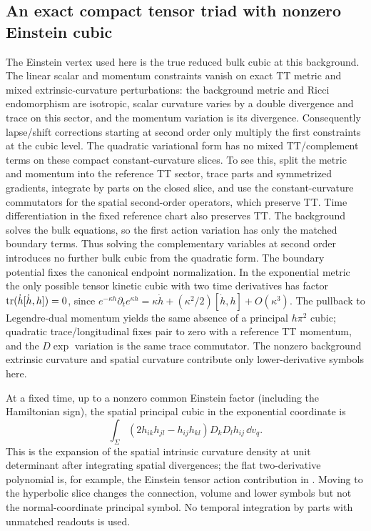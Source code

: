\subsection{An exact compact tensor triad with nonzero Einstein cubic}

The Einstein vertex used here is the true reduced bulk cubic at this background. The linear scalar and momentum constraints vanish on exact TT metric and mixed extrinsic-curvature perturbations: the background metric and Ricci endomorphism are isotropic, scalar curvature varies by a double divergence and trace on this sector, and the momentum variation is its divergence. Consequently lapse/shift corrections starting at second order only multiply the first constraints at the cubic level. The quadratic variational form has no mixed TT/complement terms on these compact constant-curvature slices. To see this, split the metric and momentum into the reference TT sector, trace parts and symmetrized gradients, integrate by parts on the closed slice, and use the constant-curvature commutators for the spatial second-order operators, which preserve TT. Time differentiation in the fixed reference chart also preserves TT. The background solves the bulk equations, so the first action variation has only the matched boundary terms. Thus solving the complementary variables at second order introduces no further bulk cubic from the quadratic form. The boundary potential fixes the canonical endpoint normalization. In the exponential metric the only possible tensor kinetic cubic with two time derivatives has factor \(\operatorname{tr}(\dot h[\dot h,h])=0\), since
\(e^{-\kappa h}\partial_t e^{\kappa h}=\kappa\dot h+
(\kappa^2/2)[\dot h,h]+O(\kappa^3)\).
The pullback to Legendre-dual momentum yields the same absence of a principal \(h\pi^2\) cubic; quadratic trace/longitudinal fixes pair to zero with a reference TT momentum, and the \(D\exp\) variation is the same trace commutator. The nonzero background extrinsic curvature and spatial curvature contribute only lower-derivative symbols here.

At a fixed time, up to a nonzero common Einstein factor (including the Hamiltonian sign), the spatial principal cubic in the exponential coordinate is
\begin{equation}
 \int_\Sigma (2h_{ik}h_{jl}-h_{ij}h_{kl})
                           D_kD_l h_{ij}\,\dd v_q .
 \label{eq:vertex}
\end{equation}
This is the expansion of the spatial intrinsic curvature density at unit determinant after integrating spatial divergences; the flat two-derivative polynomial is, for example, the Einstein tensor action contribution in \cite[Eq.~(3.1)]{Cabass}. Moving to the hyperbolic slice changes the connection, volume and lower symbols but not the normal-coordinate principal symbol. No temporal integration by parts with unmatched readouts is used.

